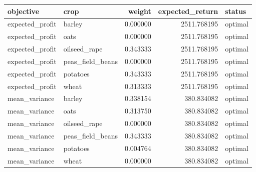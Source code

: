 \begin{tabular}{llrrl}
\toprule
objective & crop & weight & expected\_return & status \\
\midrule
expected\_profit & barley & 0.000000 & 2511.768195 & optimal \\
expected\_profit & oats & 0.000000 & 2511.768195 & optimal \\
expected\_profit & oilseed\_rape & 0.343333 & 2511.768195 & optimal \\
expected\_profit & peas\_field\_beans & 0.000000 & 2511.768195 & optimal \\
expected\_profit & potatoes & 0.343333 & 2511.768195 & optimal \\
expected\_profit & wheat & 0.313333 & 2511.768195 & optimal \\
mean\_variance & barley & 0.338154 & 380.834082 & optimal \\
mean\_variance & oats & 0.313750 & 380.834082 & optimal \\
mean\_variance & oilseed\_rape & 0.000000 & 380.834082 & optimal \\
mean\_variance & peas\_field\_beans & 0.343333 & 380.834082 & optimal \\
mean\_variance & potatoes & 0.004764 & 380.834082 & optimal \\
mean\_variance & wheat & 0.000000 & 380.834082 & optimal \\
\bottomrule
\end{tabular}
